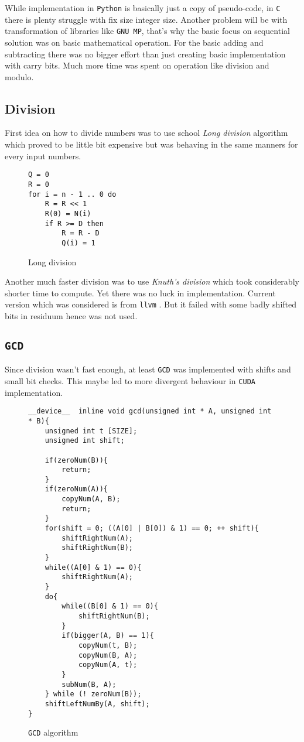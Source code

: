 \documentclass[a4paper]{article}
\begin{document}
While implementation in \texttt{Python} is basically just a copy of pseudo-code, in \texttt{C} there is plenty struggle with fix size integer size. Another problem will be with transformation of libraries like \texttt{GNU MP}, that's why the basic focus on sequential solution was on basic mathematical operation. For the basic adding and subtracting there was no bigger effort than just creating basic implementation with carry bits. Much more time was spent on operation like division and modulo.

\subsection{Division}

First idea on how to divide numbers was to use school \emph{Long division} algorithm which proved to be little bit expensive but was behaving in the same manners for every input numbers.

\begin{figure}[H]
	\centering
	\begin{lstlisting}
Q = 0
R = 0                     
for i = n - 1 .. 0 do
    R = R << 1
    R(0) = N(i)
    if R >= D then
        R = R - D
        Q(i) = 1
	\end{lstlisting}
	\caption{Long division \cite{long_div}}
	\label{long_div}
\end{figure}

Another much faster division was to use \emph{Knuth's division} \cite{knuth} which took considerably shorter time to compute. Yet there was no luck in implementation. Current version which was considered is from \texttt{llvm} \cite{llvm}. But it failed with some badly shifted bits in residuum hence was not used.

\subsection{\texttt{GCD}}

Since division wasn't fast enough, at least \texttt{GCD} was implemented with shifts and small bit checks. This maybe led to more divergent behaviour in \texttt{CUDA} implementation.

\begin{figure}[H]
	\centering
	\begin{lstlisting}
__device__  inline void gcd(unsigned int * A, unsigned int * B){
    unsigned int t [SIZE];
    unsigned int shift;

    if(zeroNum(B)){
        return;
    }
    if(zeroNum(A)){
        copyNum(A, B);
        return;
    }
    for(shift = 0; ((A[0] | B[0]) & 1) == 0; ++ shift){
        shiftRightNum(A);
        shiftRightNum(B);
    }
    while((A[0] & 1) == 0){
        shiftRightNum(A);
    }
    do{
        while((B[0] & 1) == 0){
            shiftRightNum(B);
        }
        if(bigger(A, B) == 1){
            copyNum(t, B);
            copyNum(B, A);
            copyNum(A, t);
        }
        subNum(B, A);
    } while (! zeroNum(B));
    shiftLeftNumBy(A, shift);
}
	\end{lstlisting}
	\caption{\texttt{GCD} algorithm}
	\label{gcd}
\end{figure}
\end{document}
